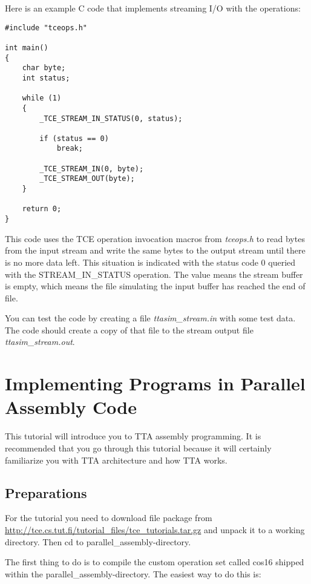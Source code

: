 \documentclass[twoside]{tceusermanual}
\begin{document}
Here is an example C code that implements streaming I/O with the operations:

\begin{verbatim}
#include "tceops.h"

int main()
{
    char byte;
    int status;

    while (1)
    {
        _TCE_STREAM_IN_STATUS(0, status);

        if (status == 0)
            break;

        _TCE_STREAM_IN(0, byte);
        _TCE_STREAM_OUT(byte);
    }

    return 0;
}
\end{verbatim}

This code uses the TCE operation invocation macros from \textit{tceops.h}
to read bytes from the input stream and write the same bytes to the
output stream until there is no more data left. This situation is indicated
with the status code 0 queried with the STREAM\_IN\_STATUS operation. The
value means the stream buffer is empty, which means the file simulating the
input buffer has reached the end of file.

You can test the code by creating a file \textit{ttasim\_stream.in}
with some test data. The code should create a copy of that file to the
stream output file \textit{ttasim\_stream.out}.

\section{Implementing Programs in Parallel Assembly Code}
\label{section:parallelAssemblyCoding}

This tutorial will introduce you to TTA assembly programming. It is
recommended that you go through this tutorial because it will certainly
familiarize you with TTA architecture and how TTA works.

\subsection{Preparations}

For the tutorial you need to download file package from
\url{http://tce.cs.tut.fi/tutorial_files/tce_tutorials.tar.gz} and unpack it
to a working directory. Then cd to parallel\_assembly-directory.

The first thing to do is to compile the custom operation set called cos16 shipped
within the parallel\_assembly-directory. The easiest way to do this is:
\end{document}
